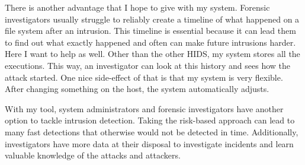 There is another advantage that I hope to give with my system. Forensic investigators usually struggle to reliably create a timeline of what happened on a file system after an intrusion. This timeline is essential because it can lead them to find out what exactly happened and often can make future intrusions harder. Here I want to help as well. Other than the other HIDS, my system stores all the executions. This way, an investigator can look at this history and sees how the attack started. One nice side-effect of that is that my system is very flexible. After changing something on the host, the system automatically adjusts.

With my tool, system administrators and forensic investigators have another option to tackle intrusion detection. Taking the risk-based approach can lead to many fast detections that otherwise would not be detected in time. Additionally, investigators have more data at their disposal to investigate incidents and learn valuable knowledge of the attacks and attackers.